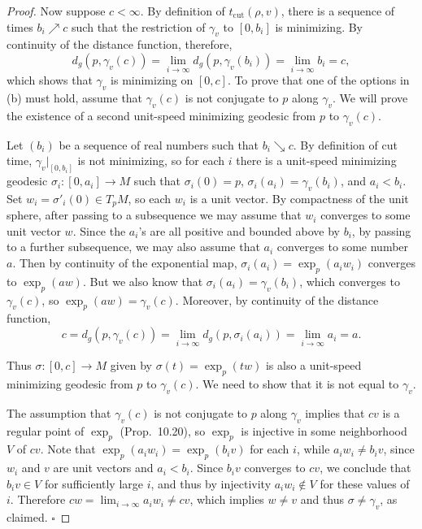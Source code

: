 \begin{proposition}
\begin{proof}
Now suppose $c < \infty$. By definition of $t_{\text{cut}}(\rho, v)$, there is a sequence of times $b_i \nearrow c$ such that the restriction of $\gamma_v$ to $[0,b_i]$ is minimizing. By continuity of the distance function, therefore,
\[d_g(p, \gamma_v(c)) = \lim_{i \to \infty} d_g(p, \gamma_v(b_i)) = \lim_{i \to \infty} b_i = c,\]
which shows that $\gamma_v$ is minimizing on $[0,c]$. To prove that one of the options in (b) must hold, assume that $\gamma_v(c)$ is not conjugate to $p$ along $\gamma_v$. We will prove the existence of a second unit-speed minimizing geodesic from $p$ to $\gamma_v(c)$.

Let $(b_i)$ be a sequence of real numbers such that $b_i \searrow c$. By definition of cut time, $\gamma_v|_{[0,b_i]}$ is not minimizing, so for each $i$ there is a unit-speed minimizing geodesic $\sigma_i: [0,a_i] \to M$ such that $\sigma_i(0) = p$, $\sigma_i(a_i) = \gamma_v(b_i)$, and $a_i < b_i$. Set $w_i = \sigma'_i(0) \in T_p M$, so each $w_i$ is a unit vector. By compactness of the unit sphere, after passing to a subsequence we may assume that $w_i$ converges to some unit vector $w$. Since the $a_i$'s are all positive and bounded above by $b_i$, by passing to a further subsequence, we may also assume that $a_i$ converges to some number $a$. Then by continuity of the exponential map, $\sigma_i(a_i) = \exp_p(a_i w_i)$ converges to $\exp_p(aw)$. But we also know that $\sigma_i(a_i) = \gamma_v(b_i)$, which converges to $\gamma_v(c)$, so $\exp_p(aw) = \gamma_v(c)$. Moreover, by continuity of the distance function,
\[c = d_g(p, \gamma_v(c)) = \lim_{i \to \infty} d_g(p, \sigma_i(a_i)) = \lim_{i \to \infty} a_i = a.\]

Thus $\sigma: [0,c] \to M$ given by $\sigma(t) = \exp_p(tw)$ is also a unit-speed minimizing geodesic from $p$ to $\gamma_v(c)$. We need to show that it is not equal to $\gamma_v$.

The assumption that $\gamma_v(c)$ is not conjugate to $p$ along $\gamma_v$ implies that $cv$ is a regular point of $\exp_p$ (Prop.\ 10.20), so $\exp_p$ is injective in some neighborhood $V$ of $cv$. Note that $\exp_p(a_i w_i) = \exp_p(b_i v)$ for each $i$, while $a_i w_i \ne b_i v$, since $w_i$ and $v$ are unit vectors and $a_i < b_i$. Since $b_i v$ converges to $cv$, we conclude that $b_i v \in V$ for sufficiently large $i$, and thus by injectivity $a_i w_i \notin V$ for these values of $i$. Therefore $cw = \lim_{i \to \infty} a_i w_i \ne cv$, which implies $w \ne v$ and thus $\sigma \ne \gamma_v$, as claimed. $\square$
\end{proof}
\end{proposition}

